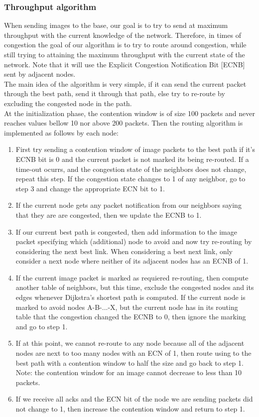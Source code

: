 \documentclass[letterpaper]{article}
\begin{document}
\subsubsection{Throughput algorithm}

When sending images to the base, our goal is to try to send at maximum throughput with the current knowledge
of the network. Therefore, in times of congestion the goal of our algorithm is to try to route around 
congestion, while still trying to attaining the maximum throughput with the current state of the network. 
Note that it will use the Explicit Congestion Notification Bit [ECNB] sent by adjacent nodes.\\ 

\noindent The main idea of the algorithm is very simple, if it can send the current packet through the best path, send 
it through that path, else try to re-route by excluding the congested node in the path.\\
 

At the initialization phase, the contention window is of size 100 packets and never reaches values bellow 10 nor above 200 packets. Then the routing algorithm is implemented as follows by each node:

\begin{enumerate}

  \item First try sending a contention window of image packets to the best path if it's ECNB bit is 0 and the current packet is not marked its being re-routed. If a time-out ocurrs, and the congestion state of the neighbors does not change, repeat this step. If the congestion state changes to 1 of any neighbor, go to step 3 and change the appropriate ECN bit to 1.
  \item If the current node gets any packet notification from our neighbors saying that they are are congested, then we update the ECNB to 1.
  \item If our current best path is congested, then add information to the image packet specifying which (additional) node to avoid and now try re-routing by considering the next best link. When considering a best next link, only consider a next node where neither of its adjacent nodes has an ECNB of 1. 
  \item If the current image packet is marked as requiered re-routing, then compute another table of neighbors, but this time, exclude the congested nodes and its edges whenever Dijkstra's shortest path is computed. If the current node is marked to avoid nodes A-B-...-X, but the current node has in its routing table that the congestion changed the ECNB to 0, then ignore the marking and go to step 1.
  \item If at this point, we cannot re-route to any node because all of the adjacent nodes are next to too many nodes with an ECN of 1, then route using to the best path with a contention window to half the size and go back to step 1. Note: the contention window for an image cannot decrease to less than 10 packets.
  \item If we receive all acks and the ECN bit of the node we are sending packets did not change to 1, then increase the contention window and return to step 1.
\end{enumerate}
\end{document}

